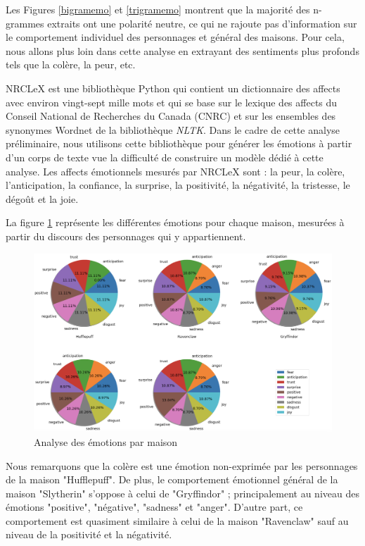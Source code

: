 \documentclass[11pt]{article}
\begin{document}
\begin{center}
Les Figures \ref{bigramemo} et \ref{trigramemo} montrent que la majorité des n-grammes extraits ont une polarité neutre, ce qui ne rajoute pas d'information sur le comportement individuel des personnages et général des maisons. Pour cela, nous allons plus loin dans cette analyse en extrayant des sentiments plus profonds tels que la colère, la peur, etc.\par

NRCLeX est une bibliothèque Python qui contient un dictionnaire des affects avec environ vingt-sept mille mots et qui se base sur le lexique des affects du Conseil National de Recherches du Canada (CNRC) et sur les ensembles des synonymes Wordnet de la bibliothèque \textit{NLTK}.
Dans le cadre de cette analyse préliminaire, nous utilisons cette bibliothèque pour générer les émotions à partir d'un corps de texte vue la difficulté de construire un modèle dédié à cette analyse.
Les affects émotionnels mesurés par NRCLeX sont : la peur, la colère, l'anticipation, la confiance, la surprise, la positivité, la négativité, la tristesse, le dégoût et la joie.\par

La figure \ref{emotions} représente les différentes émotions pour chaque maison, mesurées à partir du discours des personnages qui y appartiennent.

\begin{figure}[hbt!]
    \centering
    \includegraphics[width= 17 cm]{./figures/emotions_houses.png}
    \caption{Analyse des émotions par maison}
    \label{emotions}
\end{figure}
\FloatBarrier

Nous remarquons que la colère est une émotion non-exprimée par les personnages de la maison "Hufflepuff".
De plus, le comportement émotionnel général de la maison "Slytherin" s'oppose à celui de "Gryffindor" ; principalement au niveau des émotions "positive", "négative", "sadness" et "anger". D'autre part, ce comportement est quasiment similaire à celui de la maison "Ravenclaw" sauf au niveau de la positivité et la négativité.\par


\end{center}
\end{document}
